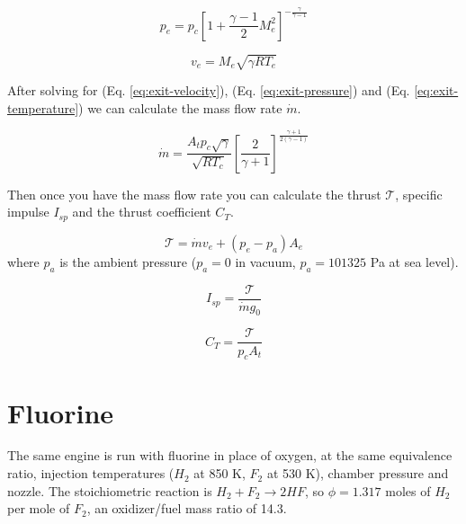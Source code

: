 \documentclass[12pt, Times New Roman]{article}
\begin{document}
    \begin{equation}
        \label{eq:exit-pressure}
        p_{e} = p_{c} \left[1 + \frac{\gamma - 1}{2} M_{e}^{2}\right]^{-\frac{\gamma}{\gamma - 1}}
    \end{equation}

    \begin{equation}
        \label{eq:exit-velocity}
        v_{e} = M_{e} \sqrt{\gamma R T_{e}}
    \end{equation}

    After solving for (Eq. \ref{eq:exit-velocity}), (Eq. \ref{eq:exit-pressure}) and (Eq. \ref{eq:exit-temperature}) we can calculate the mass flow rate $\dot{m}$.

    \begin{equation}
        \label{eq:mass-flow-rate}
        \dot{m} = \frac{A_{t} p_{c} \sqrt{\gamma}}{\sqrt{R T_{c}}} \left[ \frac{2}{\gamma + 1} \right]^{\frac{\gamma + 1}{2(\gamma - 1)}}
    \end{equation}

    Then once you have the mass flow rate you can calculate the thrust $\mathcal{T}$, specific impulse $I_{sp}$ and the thrust coefficient $C_{T}$.

    \begin{equation}
        \label{eq:thrust}
        \mathcal{T} = \dot{m} v_{e} + (p_{e} - p_{a}) A_{e}
    \end{equation}
    where $p_{a}$ is the ambient pressure ($p_{a} = 0$ in vacuum, $p_{a} = 101325$ Pa at sea level).

    \begin{equation}
        \label{eq:specific-impulse}
        I_{sp} = \frac{\mathcal{T}}{\dot{m} g_{0}}
    \end{equation}

    \begin{equation}
        \label{eq:thrust-coefficient}
        C_{T} = \frac{\mathcal{T}}{p_{c} A_{t}}
    \end{equation}

    




        \section{Fluorine}
    \label{sec:fluorine}

    The same engine is run with fluorine in place of oxygen, at the same equivalence ratio, injection temperatures
    ($H_{2}$ at 850 K, $F_{2}$ at 530 K), chamber pressure and nozzle. The stoichiometric reaction is
    $H_{2} + F_{2} \rightarrow 2HF$, so $\phi = 1.317$ moles of $H_{2}$ per mole of $F_{2}$, an oxidizer/fuel mass ratio of 14.3.
\end{document}
